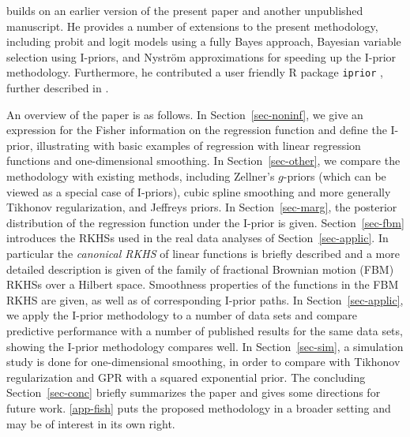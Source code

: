 \documentclass[preprint,12pt,authoryear]{elsarticle}
\begin{document}
\citet{jamil18} builds on an earlier version of the present paper and another unpublished manuscript. He provides a number of extensions to the present methodology, including probit and logit models using a fully Bayes approach, Bayesian variable selection using I-priors, and Nystr\"om approximations for speeding up the I-prior methodology. Furthermore, he contributed a user friendly R package \texttt{iprior} \citep{jamil19package}, further described in \citet{jb19}.




An overview of the paper is as follows. 
In Section~\ref{sec-noninf}, we give an expression for the Fisher information on the regression function and define the I-prior, illustrating with basic examples of regression with linear regression functions and one-dimensional smoothing.
In Section~\ref{sec-other}, we compare the methodology with existing methods, including Zellner's $g$-priors (which can be viewed as a special case of I-priors), cubic spline smoothing and more generally Tikhonov regularization, and Jeffreys priors. 
In Section~\ref{sec-marg}, the posterior distribution of the regression function under the I-prior is given. 
Section~\ref{sec-fbm} introduces the RKHSs used in the real data analyses of Section~\ref{sec-applic}. In particular the {\em canonical RKHS} of linear functions is briefly described and a more detailed description is given of the family of fractional Brownian motion (FBM) RKHSs over a Hilbert space.
Smoothness properties of the functions in the FBM RKHS are given, as well as of corresponding I-prior paths. 
In Section~\ref{sec-applic}, we apply the I-prior methodology to a number of data sets and compare predictive performance with a number of published results for the same data sets, showing the I-prior methodology compares well.
In Section~\ref{sec-sim}, a simulation study is done for one-dimensional smoothing, in order to compare with Tikhonov regularization and GPR with a squared exponential prior. 
The concluding Section~\ref{sec-conc} briefly summarizes the paper and gives some directions for future work. 
\ref{app-fish} puts the proposed methodology in a broader setting and may be of interest in its own right. 
\end{document}

